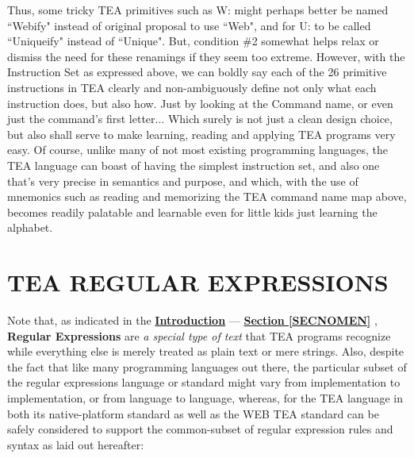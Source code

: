 \documentclass[a4paper, 18pt]{book} %
\begin{document}
Thus, some tricky TEA primitives such as W: might perhaps better be named ``Webify" instead of original proposal to use ``Web", and for U: to be called ``Uniqueify" instead of ``Unique". But, condition \#2 somewhat helps relax or dismiss the need for these renamings if they seem too extreme. However, with the Instruction Set as expressed above, we can boldly say each of the 26 primitive instructions in TEA clearly and non-ambiguously define not only what each instruction does, but also how. Just by looking at the Command name, or even just the command's first letter... Which surely is not just a clean design choice, but also shall serve to make learning, reading and applying TEA programs very easy. Of course, unlike many of not most existing programming languages, the TEA language can boast of having the simplest instruction set, and also one that's very precise in semantics and purpose, and which, with the use of mnemonics such as reading and memorizing the TEA command name map above, becomes readily palatable and learnable even for little kids just learning the alphabet.

\chapter{TEA REGULAR EXPRESSIONS}
\label{SECREGEXP}

Note that, as indicated in the \textbf{\hyperref[SEC1]{Introduction}} --- \textbf{\hyperref[SECNOMEN]{Section \ref{SECNOMEN}}} , \textbf{Regular Expressions} are \textit{a special type of text} that TEA programs recognize while everything else is merely treated as plain text or mere strings. Also, despite the fact that like many programming languages out there, the particular subset of the regular expressions language or standard might vary from implementation to implementation, or from language to language, whereas, for the TEA language in both its native-platform standard as well as the WEB TEA standard can be safely considered to support the common-subset of regular expression rules and syntax as laid out hereafter:
\end{document}
